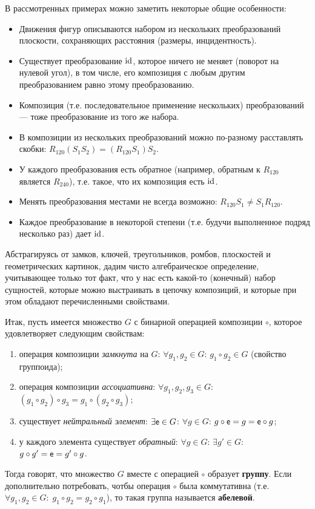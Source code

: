 В рассмотренных примерах можно заметить некоторые общие особенности:
\begin{itemize}
\item Движения фигур описываются набором из нескольких преобразований плоскости, сохраняющих расстояния (размеры, инцидентность).
\item Существует преобразование $\mathrm{id}$, которое ничего не меняет (поворот на нулевой угол), в том числе, его композиция с любым другим преобразованием равно этому преобразованию.
\item Композиция (т.е. последовательное применение нескольких) преобразований --- тоже преобразование из того же набора.
\item В композиции из нескольких преобразований можно по-разному расставлять скобки: $R_{120}(S_1S_2)=(R_{120}S_1)S_2$.
\item У каждого преобразования есть обратное (например, обратным к $R_{120}$ является $R_{240}$), т.е. такое, что их композиция есть $\mathrm{id}$.
\item Менять преобразования местами не всегда возможно: $R_{120}S_1\ne S_1R_{120}$.
\item Каждое преобразование в некоторой степени (т.е. будучи выполненное подряд несколько раз) дает $\mathrm{id}$.
\end{itemize}

Абстрагируясь от замков, ключей, треугольников, ромбов, плоскостей и геометрических картинок, дадим чисто алгебраическое определение, учитывающее только тот факт, что у нас есть какой-то (конечный) набор сущностей, которые можно выстраивать в цепочку композиций, и которые при этом обладают перечисленными свойствами.

Итак, пусть имеется множество $G$ с бинарной операцией композиции $\circ$, которое удовлетворяет следующим свойствам:
\begin{enumerate}[G1]
\item операция композиции \textit{замкнута} на $G$: $\forall g_1,g_2\in G$: $g_1\circ g_2\in G$ (свойство группоида);
\item операция композиции \textit{ассоциативна}: $\forall g_1,g_2,g_3\in G$: $(g_1\circ g_2)\circ g_3=g_1\circ (g_2\circ g_3)$;
\item существует \textit{нейтральный элемент}: $\exists\mathsf e\in G$: $\forall g\in G$: $g\circ\mathsf e=g=\mathsf e\circ g$;
\item у каждого элемента существует \textit{обратный}: $\forall g\in G$: $\exists g'\in G$: $g\circ g'=\mathsf e=g'\circ g$.
\end{enumerate}
Тогда говорят, что множество $G$ вместе с операцией $\circ$ образует \textbf{группу}. Если дополнительно потребовать, чотбы операция $\circ$ была коммутативна (т.е. $\forall g_1,g_2\in G:\;g_1\circ g_2=g_2\circ g_1$), то такая группа называется \textbf{абелевой}.

